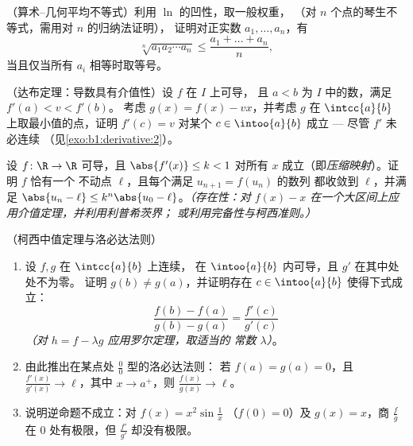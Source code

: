 \begin{exercise}[$\star\star$]\label{exo:b1:derivative:9}
（算术--几何平均不等式）利用 $\ln$ 的凹性，取一般权重，
（对 $n$ 个点的琴生不等式，需用对 $n$ 的归纳法证明），
证明对正实数 $a_1, \dots, a_n$，有
\[
\sqrt[n]{a_1 a_2 \cdots a_n} \leq \frac{a_1 + \dots + a_n}{n},
\]
当且仅当所有 $a_i$ 相等时取等号。
\end{exercise}

\begin{exercise}[$\star\star\star$]\label{exo:b1:derivative:10}
（达布定理：导数具有介值性）设 $f$ 在 $I$ 上可导，
且 $a < b$ 为 $I$ 中的数，满足 $f'(a) < v < f'(b)$。
考虑 $g(x) = f(x) - vx$，并考虑 $g$ 在
$\intcc{a}{b}$ 上取最小值的点，证明 $f'(c) = v$ 对某个 $c
\in \intoo{a}{b}$ 成立 --- 尽管 $f'$ 未必连续
（见\cref{exo:b1:derivative:2}）。
\end{exercise}

\begin{exercise}[$\star\star\star$]\label{exo:b1:derivative:11}
设 $f \colon \R \to \R$ 可导，且 $\abs{f'(x)} \leq k
< 1$ 对所有 $x$ 成立（即\emph{压缩映射}）。证明 $f$ 恰有一个
不动点 $\ell$，且每个满足 $u_{n+1} = f(u_n)$ 的数列
都收敛到 $\ell$，并满足 $\abs{u_n - \ell} \leq k^n\abs{u_0 -
\ell}$。\emph{（存在性：对
$f(x) - x$ 在一个大区间上应用介值定理，并利用利普希茨界；
或利用完备性与柯西准则。）}
\end{exercise}

\begin{exercise}[$\star\star\star$]\label{exo:b1:derivative:12}
（柯西中值定理与洛必达法则）
\begin{enumerate}
  \item 设 $f, g$ 在 $\intcc{a}{b}$ 上连续，
        在 $\intoo{a}{b}$ 内可导，且 $g'$ 在其中处处不为零。
        证明 $g(b) \neq g(a)$，并证明存在 $c \in
        \intoo{a}{b}$ 使得下式成立：
        \[
        \frac{f(b) - f(a)}{g(b) - g(a)} = \frac{f'(c)}{g'(c)}
        \]
        \emph{（对 $h = f - \lambda g$ 应用罗尔定理，取适当的
        常数 $\lambda$）}。
  \item 由此推出在某点处 $\frac00$ 型的洛必达法则：
        若 $f(a) = g(a) = 0$，且
        $\frac{f'(x)}{g'(x)} \to \ell$，其中 $x \to a^+$，则
        $\frac{f(x)}{g(x)} \to \ell$。
  \item 说明逆命题不成立：对 $f(x) = x^2\sin\frac1x$
        （$f(0) = 0$）及 $g(x) = x$，商
        $\frac{f}{g}$ 在 $0$ 处有极限，但
        $\frac{f'}{g'}$ 却没有极限。
\end{enumerate}
\end{exercise}

